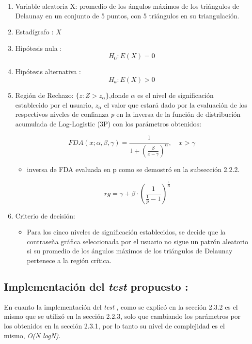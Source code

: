 \documentclass[12pt]{report}
\begin{document}
\begin{enumerate}
	\item Variable aleatoria X: promedio de los ángulos máximos de los triángulos de Delaunay en un conjunto de 5 puntos, con 5 triángulos en su triangulación.
	\item Estadígrafo : $X$
	
	\item Hipótesis nula : \[H_0:E(X)=0\]
	
	
	\item Hipótesis alternativa : \[H_a:E(X)>0\]
	
	\item  Región de Rechazo: $\{z:Z>z_\alpha\}$,donde $\alpha$ es el nivel de significación establecido por el usuario,  $z_\alpha$  el valor que estará dado por la evaluación de los respectivos niveles de confianza \textit{p} en la  inversa de la función de distribución acumulada de Log-Logistic (3P) con los parámetros obtenidos: 
	
	\[
	FDA(x; \alpha, \beta, \gamma) = \frac{1}{1 + \left( \frac{\beta}{x - \gamma} \right)^\alpha}, \quad x > \gamma
	\]
	\begin{itemize}
		\item inversa de FDA evaluada en p como se demostró en la subsección 2.2.2.
		
	
		\[
		rg = \gamma + \beta \cdot \left( \frac{1}{\frac{1}{p}-1} \right)^{\frac{1}{\alpha}}
		\]
		
	\end{itemize}
	\item Criterio de decisión:
	\begin{itemize}
		\item Para los cinco niveles de significación establecidos, se decide que la contraseña gráfica seleccionada por el usuario no sigue un patrón aleatorio si su promedio de los ángulos máximos de los triángulos de Delaunay  pertenece a la región crítica. 
	\end{itemize}
\end{enumerate}
\subsection{Implementación del \textit{test} propuesto :}
En cuanto  la implementación del \textit{test} , como se explicó en la sección 2.3.2 es el mismo que se utilizó en la sección 2.2.3, solo que cambiando los parámetros por los obtenidos en la sección 2.3.1, por lo tanto su nivel de complejidad es el mismo, \textit{O(N logN)}.
\end{document}
